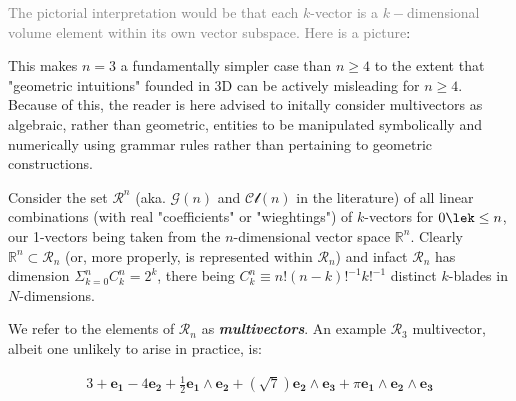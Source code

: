 \documentclass[a4paper]{book}
\numberwithin{equation}{chapter}
\begin{document}
\textcolor{gray}{The pictorial interpretation would be that each $k$-vector is a
$k-$dimensional volume element within its own vector subspace. Here is a picture}:

\vspace{\baselineskip}

\noindent
\begin{minipage}{\linewidth}
\label{fig:ga1}
\end{minipage}

\vspace{\baselineskip}

This makes $n=3$ a fundamentally simpler case than $n\ge4$ to the 
extent that "geometric intuitions" founded in 3D can be actively misleading for $n\ge4$.
Because of this, the reader is here advised to initally consider multivectors as algebraic,
rather than geometric, entities to be manipulated symbolically 
and numerically using grammar rules rather than pertaining to geometric constructions.

\vspace{\baselineskip}

Consider the set $\mathcal{R}^n$ (aka. $\mathcal{G}(n)$ and 
$\mathcal{Cl}(n)$ in the literature) of all linear combinations (with real "coefficients" or 
"wieghtings") of $k$-vectors for $0\lek\le n$, our 1-vectors being taken from the $n$-dimensional vector space $\mathbb{R}^n$. Clearly $\mathbb{R}^n \subset \mathcal{R}_n$ 
(or, more properly, is represented within $\mathcal{R}_n$) 
and infact $\mathcal{R}_n$ has dimension $\Sigma_{k=0}^n C_k^n = 2^k$, 
there being $C^n_k \equiv n!(n-k)!^{-1}k!^{-1}$ distinct $k$-blades in $N$-dimensions.

\vspace{\baselineskip}

We refer to the elements of $\mathcal{R}_n$ as \textbf{\emph{multivectors}}.
An example $\mathcal{R}_3$ multivector, albeit one unlikely to arise in practice, is:

\begin{align*}
    3+\mathbf{e_1}-4\mathbf{e_2} + \frac{1}{2} \mathbf{e_1}\wedge \mathbf{e_2}
    +(\sqrt{7})\mathbf{e_2}\wedge\mathbf{e_3} + \pi \mathbf{e_1}\wedge \mathbf{e_2} \wedge
    \mathbf{e_3}
\end{align*}

\vspace{\baselineskip}
\end{document}
